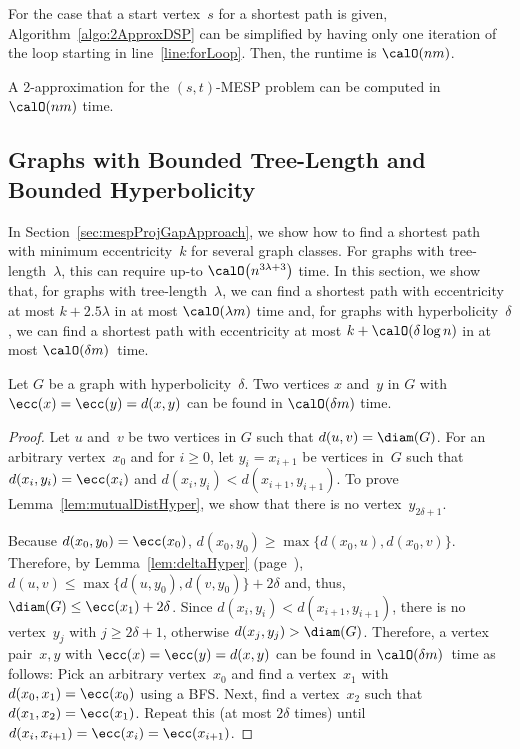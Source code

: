 For the case that a start vertex~$s$ for a shortest path is given, Algorithm~\ref{algo:2ApproxDSP} can be simplified by having only one iteration of the loop starting in line~\ref{line:forLoop}.
Then, the runtime is $\calO(nm)$.

\begin{corollary}
A 2-approximation for the \( (s,t) \)-MESP problem can be computed in \( \calO(nm) \) time.
\end{corollary}


\subsection{Graphs with Bounded Tree-Length and Bounded Hyperbolicity}

In Section~\ref{sec:mespProjGapApproach}, we show how to find a shortest path with minimum eccentricity~$k$ for several graph classes.
For graphs with tree-length~$\lambda$, this can require up-to $\calO \big( n^{3\lambda + 3} \big)$ time.
In this section, we show that, for graphs with tree-length~$\lambda$, we can find a shortest path with eccentricity at most $k + 2.5\lambda$ in at most $\calO(\lambda m)$ time and, for graphs with hyperbolicity~$\delta$, we can find a shortest path with eccentricity at most $k + \calO(\delta \log n)$ in at most $\calO(\delta m)$~time.

\begin{lemma}
    \label{lem:mutualDistHyper}
Let \( G \) be a graph with hyperbolicity~\( \delta \).
Two vertices \( x \) and~\( y \) in \( G \) with \( \ecc(x) = \ecc(y) = d(x, y) \) can be found in \( \calO(\delta m) \) time.
\end{lemma}

\begin{proof}
Let $u$ and~$v$ be two vertices in $G$ such that $d(u, v) = \diam(G)$.
For an arbitrary vertex~$x_0$ and for $i \geq 0$, let $y_i = x_{i+1}$ be vertices in~$G$ such that $d(x_i, y_i) = \ecc(x_i)$ and $d(x_i, y_i) < d(x_{i+1}, y_{i+1})$.
To prove Lemma~\ref{lem:mutualDistHyper}, we show that there is no vertex~$y_{2\delta + 1}$.

Because $d(x_0, y_0) = \ecc(x_0)$, $d(x_0, y_0) \geq \max \big \{ d(x_0, u), d(x_0 ,v) \big \}$.
Therefore, by Lemma~\ref{lem:deltaHyper} (page~\pageref{lem:deltaHyper}), $d(u, v) \leq \max \big \{ d(u, y_0), d(v, y_0) \big \} + 2\delta$ and, thus, $\diam(G) \leq \ecc(x_1) + 2\delta$.
Since $d(x_i, y_i) < d(x_{i+1}, y_{i+1})$, there is no vertex~$y_j$ with $j \geq 2\delta + 1$, otherwise $d(x_j, y_j) > \diam(G)$.
Therefore, a vertex pair~$x,y$ with $\ecc(x) = \ecc(y) = d(x, y)$ can be found in $\calO(\delta m)$~time as follows:
Pick an arbitrary vertex~$x_0$ and find a vertex~$x_1$ with $d(x_0, x_1) = \ecc(x_0)$ using a BFS.
Next, find a vertex~$x_2$ such that $d(x_1, x_2) = \ecc(x_1)$.
Repeat this (at most $2\delta$ times) until $d(x_i, x_{i+1}) = \ecc(x_i) = \ecc(x_{i+1})$.
\end{proof}

